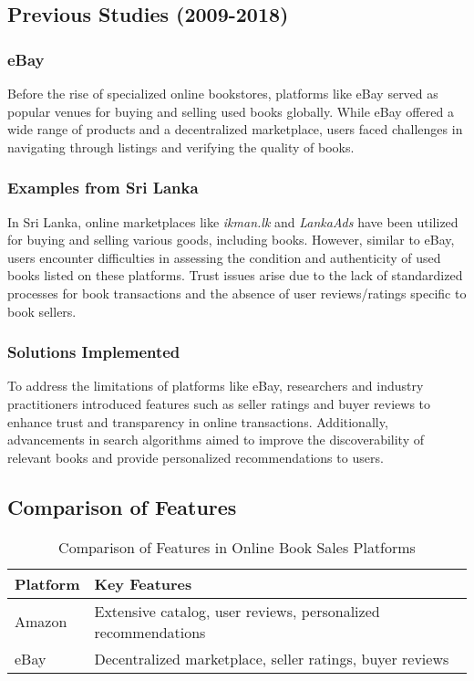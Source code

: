 \documentclass{article}
\begin{document}
\subsection{Previous Studies (2009-2018)}

\subsubsection{eBay}

Before the rise of specialized online bookstores, platforms like eBay served as popular venues for buying and selling used books globally. While eBay offered a wide range of products and a decentralized marketplace, users faced challenges in navigating through listings and verifying the quality of books.

\subsubsection{Examples from Sri Lanka}

In Sri Lanka, online marketplaces like \textit{ikman.lk} and \textit{LankaAds} have been utilized for buying and selling various goods, including books. However, similar to eBay, users encounter difficulties in assessing the condition and authenticity of used books listed on these platforms. Trust issues arise due to the lack of standardized processes for book transactions and the absence of user reviews/ratings specific to book sellers.

\subsubsection{Solutions Implemented}

To address the limitations of platforms like eBay, researchers and industry practitioners introduced features such as seller ratings and buyer reviews to enhance trust and transparency in online transactions. Additionally, advancements in search algorithms aimed to improve the discoverability of relevant books and provide personalized recommendations to users.

\subsection{Comparison of Features}

\begin{table}[htbp]
\centering
\begin{tabular}{|l|l|}
\hline
\textbf{Platform} & \textbf{Key Features} \\ \hline
Amazon & Extensive catalog, user reviews, personalized recommendations \\ \hline
eBay & Decentralized marketplace, seller ratings, buyer reviews \\ \hline
\end{tabular}
\caption{Comparison of Features in Online Book Sales Platforms}
\label{tab:features-comparison}
\end{table}
\end{document}
